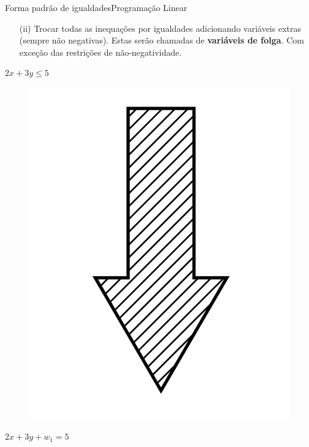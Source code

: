 \documentclass[t]{beamer}
\begin{document}
\begin{ftst}{Forma padrão de igualdades}{Programação Linear}
\begin{itemize}
    \item[(ii)] Trocar todas as inequações por igualdades adicionando variáveis extras (sempre não negativas). Estas serão chamadas de \textbf{variáveis de folga}. Com exceção das restrições de não-negatividade.
\end{itemize}
\vone
\begin{minipage}{0.45\linewidth}
        \centering $2x + 3y \leq 5$
        \begin{figure}[H]
            \centering
            \includegraphics[scale=0.05]{Figuras/seta.png}
        \end{figure}
        \centering $2x + 3y + w_1 = 5$
        

\end{minipage}
\end{ftst}
\end{document}
